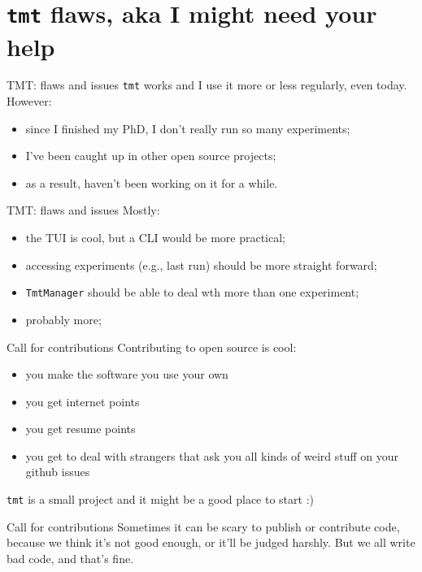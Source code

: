 \documentclass[aspectratio=169,xcolor={dvipsnames}]{beamer}
\begin{document}
  \section{\texttt{tmt} flaws, aka I might need your help} 
  \begin{frame}{TMT: flaws and issues}
    \texttt{tmt} works and I use it more or less regularly, even today.
    However:
    \begin{itemize}
      \item since I finished my PhD, I don't really run so many experiments;
      \item I've been caught up in other open source projects;
      \item as a result, haven't been working on it for a while.
    \end{itemize}
  \end{frame}
  \begin{frame}{TMT: flaws and issues}
    Mostly:
    \begin{itemize}
      \item the TUI is cool, but a CLI would be more practical;
      \item accessing experiments (e.g., last run) should be more straight forward;
      \item \texttt{TmtManager} should be able to deal wth more than one experiment;
      \item probably more;
    \end{itemize} 
  \end{frame}
  \begin{frame}{Call for contributions}
    Contributing to open source is cool:
    \begin{itemize}
      \item you make the software you use your own 
      \item you get internet points 
      \item you get resume points 
      \item \tiny{you get to deal with strangers that ask you all kinds of weird stuff on your github issues }
    \end{itemize}
    \texttt{tmt} is a small project and it might be a good place to start :)
  \end{frame}
  \begin{frame}{Call for contributions}
    Sometimes it can be scary to publish or contribute code, because we think it's not good enough, or it'll be 
    judged harshly. But we all write bad code, and that's fine.
  \end{frame}
\end{document}
